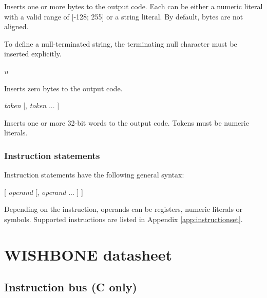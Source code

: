 \documentclass[a4paper,12pt,twoside,extrafontsizes]{memoir}
\begin{document}
Inserts one or more bytes to the output code. Each  can be either a numeric literal with a valid range of [-128; 255] or a string literal. By default, bytes are not aligned.

To define a null-terminated string, the terminating null character must be inserted explicitly.

\begin{codepar}
 \emph{n}
\end{codepar}

Inserts  zero bytes to the output code.

\begin{codepar}
 \emph{token} [, \emph{token} ... ]
\end{codepar}

Inserts one or more 32-bit words to the output code. Tokens must be numeric literals.

\subsection{Instruction statements}

Instruction statements have the following general syntax:

\begin{codepar}
     [ \emph{operand} [, \emph{operand} ... ] ]
\end{codepar}

Depending on the instruction, operands can be registers, numeric literals or symbols. Supported instructions are listed in Appendix \ref{app:instructionset}.

\chapter{WISHBONE datasheet}
\label{app:wishbonedatasheet}

\section[Instruction bus (LXP32C only)]{Instruction bus (\lxp{}C only)}
\end{document}
